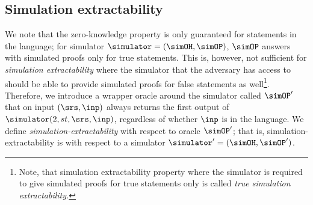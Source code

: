 \subsection{Simulation extractability}
We note that the zero-knowledge property is only guaranteed for statements in the
language; for simulator $\simulator = (\simOH, \simOP)$, $\simOP$
answers with simulated proofs only for true statements.  This is, however, not sufficient
for \emph{simulation extractability} where the simulator that the adversary has access to
should be able to provide simulated proofs for false statements as well\footnote{Note,
  that simulation extractability property where the simulator is required to give
  simulated proofs for true statements only is called \emph{true simulation
    extractability.}}. Therefore, we introduce a wrapper oracle around the simulator
called $\simOP'$ that on input $(\srs, \inp)$ always returns the first output of
$\simulator (2, st, \srs, \inp)$, regardless of whether $\inp$ is in the language. We
define \emph{simulation-extractability} with respect to oracle $\simOP'$; that is,
simulation-extractability is with respect to a simulator
$\simulator' = (\simOH, \simOP')$.
%
